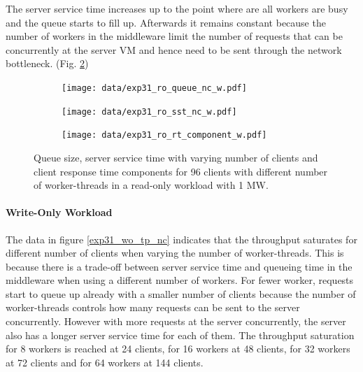 \documentclass[report.tex]{subfiles}
\begin{document}
The server service time increases up to the point where are all workers are busy and the queue starts to fill up. Afterwards it remains constant because the number of workers in the middleware limit the number of requests that can be concurrently at the server VM and hence need to be sent through the network bottleneck. (Fig. \ref{exp31_ro_sst})


\begin{figure}[H]
	\begin{subfigure}[b]{.33\linewidth}
		\centering
		\texttt{[image: data/exp31\_ro\_queue\_nc\_w.pdf]}
		\caption{}\label{exp31_ro_q}
	\end{subfigure}\hfill
	\begin{subfigure}[b]{.33\linewidth}
		\centering
		\texttt{[image: data/exp31\_ro\_sst\_nc\_w.pdf]}
		\caption{}\label{exp31_ro_sst}
	\end{subfigure}\hfill
	\begin{subfigure}[b]{.33\linewidth}
		\centering
		\texttt{[image: data/exp31\_ro\_rt\_component\_w.pdf]}
		\caption{}\label{exp31_ro_rtcomp}
	\end{subfigure}
	\caption{Queue size, server service time with varying number of clients and client response time components for 96 clients with different number of worker-threads in a read-only workload with 1 MW.}
\end{figure}


\paragraph{Write-Only Workload}


The data in figure \ref{exp31_wo_tp_nc} indicates that the throughput saturates for different number of clients when varying the number of worker-threads. This is because there is a trade-off between server service time and queueing time in the middleware when using a different number of workers. For fewer worker, requests start to queue up already with a smaller number of clients because the number of worker-threads controls how many requests can be sent to the server concurrently. However with more requests at the server concurrently, the server also has a longer server service time for each of them.
The throughput saturation for 8 workers is reached at 24 clients, for 16 workers at 48 clients, for 32 workers at 72 clients and for 64 workers at 144 clients.
\end{document}
